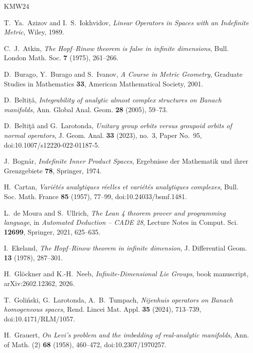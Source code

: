 \begin{thebibliography}{KMW24}

T.~Ya.~Azizov and I.~S.~Iokhvidov, \emph{Linear Operators in Spaces with an Indefinite Metric},
Wiley, 1989.

C.~J.~Atkin, \emph{The Hopf--Rinow theorem is false in infinite dimensions}, Bull. London Math.
Soc. \textbf{7} (1975), 261--266.

D.~Burago, Y.~Burago and S.~Ivanov, \emph{A Course in Metric Geometry}, Graduate Studies in
Mathematics \textbf{33}, American Mathematical Society, 2001.

D.~Beltiță, \emph{Integrability of analytic almost complex structures on Banach manifolds}, Ann.
Global Anal. Geom. \textbf{28} (2005), 59--73.

D.~Beltiţă and G.~Larotonda, \emph{Unitary group orbits versus groupoid orbits of normal
operators}, J. Geom. Anal. \textbf{33} (2023), no.~3, Paper No.~95, doi:10.1007/s12220-022-01187-5.

J.~Bognár, \emph{Indefinite Inner Product Spaces}, Ergebnisse der Mathematik und ihrer
Grenzgebiete \textbf{78}, Springer, 1974.

H.~Cartan, \emph{Variétés analytiques réelles et variétés analytiques complexes}, Bull. Soc.
Math. France \textbf{85} (1957), 77--99, doi:10.24033/bsmf.1481.

L.~de Moura and S.~Ullrich, \emph{The Lean 4 theorem prover and programming language}, in
\emph{Automated Deduction -- CADE 28}, Lecture Notes in Comput. Sci. \textbf{12699}, Springer,
2021, 625--635.

I.~Ekeland, \emph{The Hopf--Rinow theorem in infinite dimension}, J. Differential Geom.
\textbf{13} (1978), 287--301.

H.~Glöckner and K.-H.~Neeb, \emph{Infinite-Dimensional Lie Groups}, book manuscript,
arXiv:2602.12362, 2026.

T.~Goliński, G.~Larotonda, A.~B.~Tumpach, \emph{Nijenhuis operators on Banach homogeneous
spaces}, Rend. Lincei Mat. Appl. \textbf{35} (2024), 713--739, doi:10.4171/RLM/1057.

H.~Grauert, \emph{On Levi's problem and the imbedding of real-analytic manifolds}, Ann. of Math.
(2) \textbf{68} (1958), 460--472, doi:10.2307/1970257.


\end{thebibliography}
